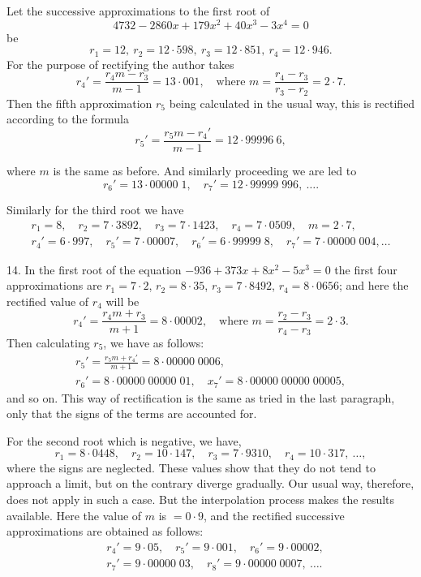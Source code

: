 \documentclass[11pt]{article}
\newcommand{\scanpage}[2]{\clearpage\setcounter{footnote}{0}\noindent{\footnotesize\color{gray}PDF page #1 · #2}\par\medskip}
\begin{document}
Let the successive approximations to the first root of
\[
4732 - 2860x + 179x^2 + 40x^3 - 3x^4 = 0
\]
be
\[
r_1 = 12,\ r_2 = 12{\cdot}598,\ r_3 = 12{\cdot}851,\ r_4 = 12{\cdot}946.
\]
For the purpose of rectifying the author takes
\[
r_4' = \frac{r_4 m - r_3}{m - 1} = 13{\cdot}001, \quad \text{where } m = \frac{r_4 - r_3}{r_3 - r_2} = 2{\cdot}7.
\]
Then the fifth approximation $r_5$ being calculated in the usual way, this is rectified according to the formula
\[
r_5' = \frac{r_5 m - r_4'}{m - 1} = 12{\cdot}99996\ 6,
\]

\scanpage{0281}{printed page 267}
\noindent where $m$ is the same as before. And similarly proceeding we are led to
\[
r_6' = 13{\cdot}00000\;1, \quad r_7' = 12{\cdot}99999\;996, \ \ldots .
\]

Similarly for the third root we have
\[
\begin{gathered}
r_1 = 8, \quad r_2 = 7{\cdot}3892, \quad r_3 = 7{\cdot}1423, \quad r_4 = 7{\cdot}0509, \quad m = 2{\cdot}7,\\
r_4' = 6{\cdot}997, \quad r_5' = 7{\cdot}00007, \quad r_6' = 6{\cdot}99999\;8, \quad r_7' = 7{\cdot}00000\;004, \ldots
\end{gathered}
\]

14. In the first root of the equation $-936 + 373x + 8x^2 - 5x^3 = 0$ the first four approximations are $r_1 = 7{\cdot}2$, $r_2 = 8{\cdot}35$, $r_3 = 7{\cdot}8492$, $r_4 = 8{\cdot}0656$; and here the rectified value of $r_4$ will be
\[
r_4' = \frac{r_4 m + r_3}{m + 1} = 8{\cdot}00002, \quad \text{where } m = \frac{r_2 - r_3}{r_4 - r_3} = 2{\cdot}3.
\]
Then calculating $r_5$, we have as follows:
\[
\begin{gathered}
r_5' = \frac{r_5 m + r_4'}{m + 1} = 8{\cdot}00000\;0006,\\
r_6' = 8{\cdot}00000\;00000\;01, \quad x_7' = 8{\cdot}00000\;00000\;00005,
\end{gathered}
\]
and so on. This way of rectification is the same as tried in the last paragraph, only that the signs of the terms are accounted for.

For the second root which is negative, we have,
\[
r_1 = 8{\cdot}0448, \quad r_2 = 10{\cdot}147, \quad r_3 = 7{\cdot}9310, \quad r_4 = 10{\cdot}317, \ \ldots,
\]
where the signs are neglected. These values show that they do not tend to approach a limit, but on the contrary diverge gradually. Our usual way, therefore, does not apply in such a case. But the interpolation process makes the results available. Here the value of $m$ is $= 0{\cdot}9$, and the rectified successive approximations are obtained as follows:
\[
\begin{aligned}
&r_4' = 9{\cdot}05, \quad r_5' = 9{\cdot}001, \quad r_6' = 9{\cdot}00002,\\
&r_7' = 9{\cdot}00000\;03, \quad r_8' = 9{\cdot}00000\;0007, \ \ldots .
\end{aligned}
\]
\end{document}
